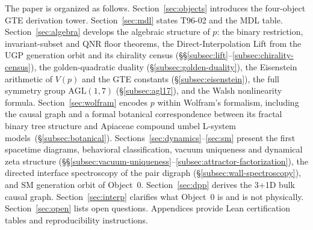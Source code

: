 \documentclass[11pt]{article}
\theoremstyle{remark}
\begin{document}
The paper is organized as follows. Section~\ref{sec:objects} introduces the
four-object GTE derivation tower. Section~\ref{sec:mdl} states T96-02 and the
MDL table. Section~\ref{sec:algebra} develops the algebraic structure of
$p$: the binary restriction, invariant-subset and QNR floor theorems, the
Direct-Interpolation Lift from the UGP generation orbit and its chirality
census (§§\ref{subsec:lift}--\ref{subsec:chirality-census}), the
golden-quadratic duality (§\ref{subsec:golden-duality}), the Eisenstein
arithmetic of $V(p)$ and the GTE constants (§\ref{subsec:eisenstein}), the
full symmetry group $\mathrm{AGL}(1,7)$ (§\ref{subsec:agl17}), and the
Walsh nonlinearity formula.
Section~\ref{sec:wolfram} encodes $p$ within Wolfram's formalism,
including the causal graph and a formal botanical correspondence between
its fractal binary tree structure and Apiaceae compound umbel L-system
models~(§\ref{subsec:botanical}).
Sections~\ref{sec:dynamics}--\ref{sec:sm} present the first spacetime diagrams,
behavioral classification, vacuum uniqueness and dynamical zeta structure
(§§\ref{subsec:vacuum-uniqueness}--\ref{subsec:attractor-factorization}),
the directed interface spectroscopy of the pair digraph
(§\ref{subsec:wall-spectroscopy}),
and SM generation orbit of Object~0.
Section~\ref{sec:dpp} derives the 3+1D bulk causal graph.
Section~\ref{sec:interp} clarifies what Object~0 is and is not physically.
Section~\ref{sec:open} lists open questions. Appendices provide Lean
certification tables and reproducibility instructions.
\end{document}
